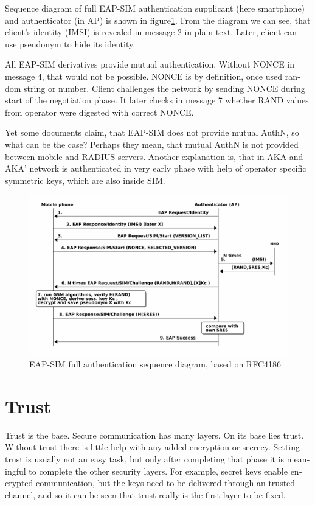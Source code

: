 \documentclass[12pt,a4paper,english]{tutthesis}
\begin{document}
\begin{otherlanguage}{english}
Sequence diagram of full EAP-SIM authentication supplicant (here
smartphone) and authenticator (in AP) is shown in
figure\ref{fig:eap-sim-full}. 
From the diagram we can see, that client's identity (IMSI) is
revealed in message 2 in plain-text. Later, client can use pseudonym to
hide its identity.

All EAP-SIM derivatives provide mutual authentication. Without NONCE
in message 4, that would not be possible. NONCE is by definition, once
used random string or number.
 Client challenges the network by
sending NONCE during start of the negotiation phase. It later checks in
message 7 whether RAND values from operator were digested with correct NONCE.

Yet some documents claim, that EAP-SIM does not provide mutual AuthN, so what
can be the case? Perhaps they mean, that mutual AuthN is not provided between
mobile and RADIUS servers. Another explanation is, that in AKA
and AKA' network is authenticated in very early phase with help of operator specific
symmetric keys, which are also inside SIM.





\begin{figure}[htb]
\centering
\includegraphics[width=.9\linewidth]{eap-sim-full.png}
\caption{\label{fig:eap-sim-full}EAP-SIM full authentication sequence diagram, based on RFC4186}
\end{figure}
\section{Trust}
\label{sec-2-6}

Trust is the base.
Secure communication has many layers. On its base lies trust. Without
trust there is little help with any added encryption or
secrecy. Setting trust is usually not an easy task, but only after
completing that phase it is meaningful to complete the other security
layers.
For example, secret keys enable encrypted communication, but the keys need to be
delivered through an trusted channel, and so it can be seen that trust
really is the first layer to be fixed. 




\end{otherlanguage}
\end{document}
